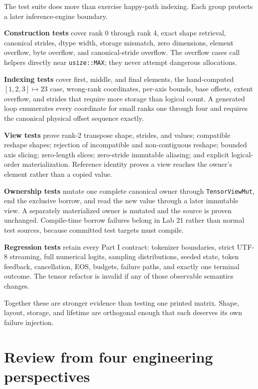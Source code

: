 The test suite does more than exercise happy-path indexing. Each group
protects a later inference-engine boundary.

\textbf{Construction tests} cover rank 0 through rank 4, exact shape
retrieval, canonical strides, dtype width, storage mismatch, zero
dimensions, element overflow, byte overflow, and canonical-stride
overflow. The overflow cases call helpers directly near
\texttt{usize::MAX}; they never attempt dangerous allocations.

\textbf{Indexing tests} cover first, middle, and final elements, the
hand-computed \([1,2,3]\mapsto23\) case, wrong-rank coordinates,
per-axis bounds, base offsets, extent overflow, and strides that require
more storage than logical count. A generated loop enumerates every
coordinate for small ranks one through four and requires the canonical
physical offset sequence exactly.

\textbf{View tests} prove rank-2 transpose shape, strides, and values;
compatible reshape shapes; rejection of incompatible and non-contiguous
reshape; bounded axis slicing; zero-length slices; zero-stride immutable
aliasing; and explicit logical-order materialization. Reference identity
proves a view reaches the owner's element rather than a copied value.

\textbf{Ownership tests} mutate one complete canonical owner through
\texttt{TensorViewMut}, end the exclusive borrow, and read the new value
through a later immutable view. A separately materialized owner is
mutated and the source is proven unchanged. Compile-time borrow failures
belong in Lab 21 rather than normal test sources, because committed test
targets must compile.

\textbf{Regression tests} retain every Part I contract: tokenizer
boundaries, strict UTF-8 streaming, full numerical logits, sampling
distributions, seeded state, token feedback, cancellation, EOS, budgets,
failure paths, and exactly one terminal outcome. The tensor refactor is
invalid if any of those observable semantics changes.

Together these are stronger evidence than testing one printed matrix.
Shape, layout, storage, and lifetime are orthogonal enough that each
deserves its own failure injection.

\section{Review from four engineering
perspectives}\label{review-from-four-engineering-perspectives}

